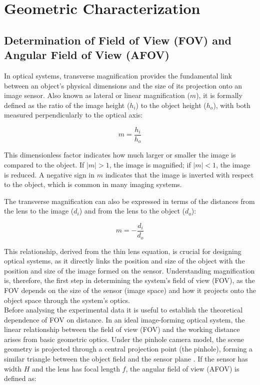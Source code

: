 \section{Geometric Characterization}




\subsection{Determination of Field of View (FOV) and Angular Field of View (AFOV)}
\label{sec:fov}

\noindent In optical systems, transverse magnification provides the fundamental link between an object's physical dimensions and the size of its projection onto an image sensor. Also known as lateral or linear magnification ($m$), it is formally defined as the ratio of the image height ($h_i$) to the object height ($h_o$), with both measured perpendicularly to the optical axis:

\begin{equation}
    m = \frac{h_i}{h_o}
\end{equation}

\noindent This dimensionless factor indicates how much larger or smaller the image is compared to the object. If $|m| > 1$, the image is magnified; if $|m| < 1$, the image is reduced. A negative sign in $m$ indicates that the image is inverted with respect to the object, which is common in many imaging systems.

\noindent The transverse magnification can also be expressed in terms of the distances from the lens to the image ($d_i$) and from the lens to the object ($d_o$):

\begin{equation}
    m = -\frac{d_i}{d_o}
\end{equation}

\noindent This relationship, derived from the thin lens equation, is crucial for designing optical systems, as it directly links the position and size of the object with the position and size of the image formed on the sensor. Understanding magnification is, therefore, the first step in determining the system's field of view (FOV), as the FOV depends on the size of the sensor (image space) and how it projects onto the object space through the system's optics.\\


\noindent Before analysing the experimental data it is useful to establish the theoretical dependence of FOV on distance. In an ideal image-forming optical system, the linear relationship between the field of view (FOV) and the working distance arises from basic geometric optics. Under the pinhole camera model, the scene geometry is projected through a central projection point (the pinhole), forming a similar triangle between the object field and the sensor plane \cite{Hecht2002Optics,StanfordPinhole}. If the sensor has width $H$ and the lens has focal length $f$, the angular field of view (AFOV) is defined as:

